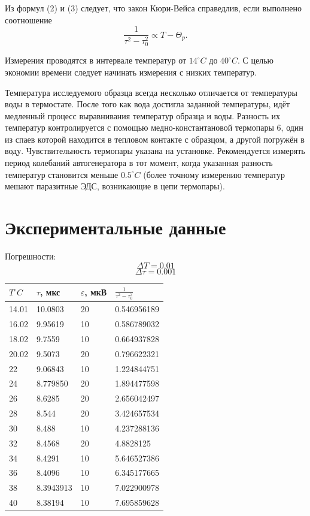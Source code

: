 \documentclass[12pt,a4paper]{article}
\begin{document}
Из формул (2) и (3) следует, что закон Кюри-Вейса справедлив, если выполнено соотношение
\[
\frac{1}{\tau^2 - \tau_0^2} \propto T - \Theta_p. \tag{4}
\]

Измерения проводятся в интервале температур от \(14^\circ C\) до \(40^\circ C\). С целью экономии времени следует начинать измерения с низких температур.



Температура исследуемого образца всегда несколько отличается от
температуры воды в термостате. После того как вода достигла заданной температуры, идёт медленный процесс выравнивания температур
образца и воды. Разность их температур контролируется с помощью
медно-константановой термопары 6, один из спаев которой находится в
тепловом контакте с образцом, а другой погружён в воду. Чувствительность термопары указана на установке. Рекомендуется измерять период
колебаний автогенератора в тот момент, когда указанная разность температур становится меньше $ 0.5^{\circ}  C$ (более точному измерению температур
мешают паразитные ЭДС, возникающие в цепи термопары).




\section{Экспериментальные данные}

Погрешности:
\[
	\Delta T = 0.01
\]
\[
	\Delta \tau = 0.001
\]
\begin{table}[!ht]
    \centering
    \begin{tabular}{|l|l|l|l|}
    \hline
        $T ^\circ C$ & $\tau$,  мкс & $\varepsilon$, мкВ & $\frac{1}{\tau^2 - \tau_0^2}$ \\ \hline
        14.01 & 10.0803 & 20 & 0.546956189 \\ \hline
        16.02 & 9.95619 & 10 & 0.586789032 \\ \hline
        18.02 & 9.7559 & 10 & 0.664937828 \\ \hline
        20.02 & 9.5073 & 20 & 0.796622321 \\ \hline
        22 & 9.06843 & 10 & 1.224844751 \\ \hline
        24 & 8.779850 & 20 & 1.894477598 \\ \hline
        26 & 8.6285 & 20 & 2.656042497 \\ \hline
        28 & 8.544 & 20 & 3.424657534 \\ \hline
        30 & 8.488 & 10 & 4.237288136 \\ \hline
        32 & 8.4568 & 20 & 4.8828125 \\ \hline
        34 & 8.4291 & 10 & 5.646527386 \\ \hline
        36 & 8.4096 & 10 & 6.345177665 \\ \hline
        38 & 8.3943913 & 10 & 7.022900978 \\ \hline
        40 & 8.38194 & 10 & 7.695859628 \\ \hline
    \end{tabular}
\end{table}
\end{document}
